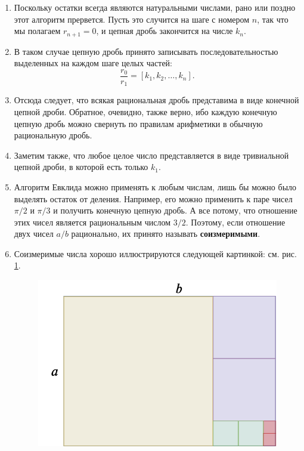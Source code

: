 \begin{enumerate}
\item Поскольку остатки всегда являются натуральными числами, рано или поздно этот алгоритм прервется. Пусть это случится на шаге с номером $n$, так что мы полагаем $r_{n+1}=0$, и цепная дробь закончится на числе $k_n$.
\item В таком случае цепную дробь принято записывать последовательностью выделенных на каждом шаге целых частей:
$$
\frac{r_0}{r_1} = [k_1,k_2,\dots,k_n].
$$
\item Отсюда следует, что всякая рациональная дробь представима в виде конечной цепной дроби. Обратное, очевидно, также верно, ибо каждую конечную цепную дробь можно свернуть по правилам арифметики в обычную рациональную дробь.
\item Заметим также, что любое целое число представляется в виде тривиальной цепной дроби, в которой есть только $k_1$.
\item Алгоритм Евклида можно применять к любым числам, лишь бы можно было выделять остаток от деления. Например, его можно применить к паре чисел $\pi/2$ и $\pi/3$ и получить конечную цепную дробь. А все потому, что отношение этих чисел является рациональным числом $3/2$. Поэтому, если отношение двух чисел $a/b$ рационально, их принято называть \textbf{соизмеримыми}.
\item\label{soizm} Соизмеримые числа хорошо иллюстрируются следующей картинкой: см. рис. \ref{soizmer2}.
\begin{figure}[hbt!]
\begin{center}
\includegraphics[scale=0.3]{soizmer.png}
\end{center}
\caption{}\label{soizmer2}
\end{figure}

\end{enumerate}
